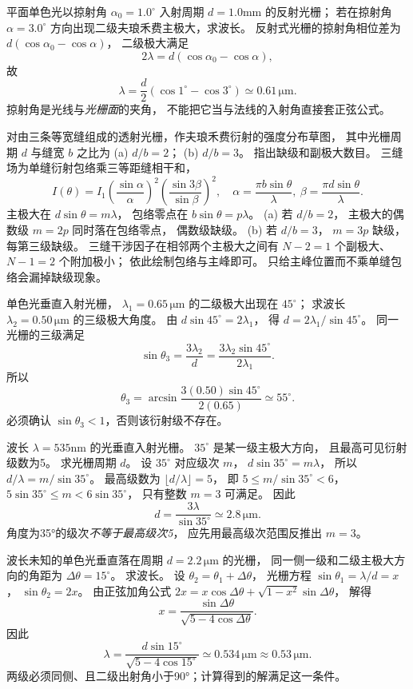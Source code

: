 平面单色光以掠射角
$\alpha_0=1.0^\circ$ 入射周期
$d=1.0$mm 的反射光栅；
若在掠射角 $\alpha=3.0^\circ$ 方向出现二级夫琅禾费主极大，求波长。
\exsolution
反射式光栅的掠射角相位差为
$d(\cos\alpha_0-\cos\alpha)$，
二级极大满足
\[
2\lambda=d(\cos\alpha_0-\cos\alpha),
\]
故
\[
\boxed{\lambda=
\frac d2(\cos1^\circ-\cos3^\circ)
\simeq0.61\,\mathrm{\mu m}}.
\]
\excheck 掠射角是光线与\emph{光栅面}的夹角，
不能把它当与法线的入射角直接套正弦公式。

对由三条等宽缝组成的透射光栅，作夫琅禾费衍射的强度分布草图，
其中光栅周期 $d$ 与缝宽 $b$ 之比为
(a) $d/b=2$；
(b) $d/b=3$。
指出缺级和副极大数目。
\exsolution
三缝场为单缝衍射包络乘三等距缝相干和，
\[
\boxed{I(\theta)=I_1
\left(\frac{\sin\alpha}{\alpha}\right)^2
\left(\frac{\sin3\beta}{\sin\beta}\right)^2},
\quad
\alpha=\frac{\pi b\sin\theta}{\lambda},\
\beta=\frac{\pi d\sin\theta}{\lambda}.
\]
主极大在 $d\sin\theta=m\lambda$，
包络零点在 $b\sin\theta=p\lambda$。
(a) 若 $d/b=2$，
主极大的偶数级 $m=2p$ 同时落在包络零点，
$\boxed{\text{偶数级缺级}}$。
(b) 若 $d/b=3$，
$m=3p$ 缺级，
$\boxed{\text{每第三级缺级}}$。
三缝干涉因子在相邻两个主极大之间有
$N-2=1$ 个副极大、$N-1=2$ 个附加极小；
依此绘制包络与主峰即可。
\excheck 只给主峰位置而不乘单缝包络会漏掉缺级现象。

单色光垂直入射光栅，
$\lambda_1=0.65\,\mathrm{\mu m}$ 的二级极大出现在
$45^\circ$；
求波长
$\lambda_2=0.50\,\mathrm{\mu m}$ 的三级极大角度。
\exsolution
由
$d\sin45^\circ=2\lambda_1$，
得
$d=2\lambda_1/\sin45^\circ$。
同一光栅的三级满足
\[
\sin\theta_3=\frac{3\lambda_2}{d}
=\frac{3\lambda_2\sin45^\circ}{2\lambda_1}.
\]
所以
\[
\boxed{\theta_3=
\arcsin\frac{3(0.50)\sin45^\circ}{2(0.65)}
\simeq55^\circ}.
\]
\excheck 必须确认 $\sin\theta_3<1$，否则该衍射级不存在。

波长 $\lambda=535$nm 的光垂直入射光栅。
$35^\circ$ 是某一级主极大方向，
且最高可见衍射级数为5。
求光栅周期 $d$。
\exsolution
设 $35^\circ$ 对应级次 $m$，
$d\sin35^\circ=m\lambda$，
所以 $d/\lambda=m/\sin35^\circ$。
最高级数为
$\lfloor d/\lambda\rfloor=5$，
即
$5\le m/\sin35^\circ<6$，
$5\sin35^\circ\le m<6\sin35^\circ$，
只有整数 $m=3$ 可满足。
因此
\[
\boxed{d=\frac{3\lambda}{\sin35^\circ}
\simeq2.8\,\mathrm{\mu m}}.
\]
\excheck 角度为35°的级次\emph{不等于最高级次5}，
应先用最高级次范围反推出 $m=3$。

波长未知的单色光垂直落在周期
$d=2.2\,\mathrm{\mu m}$ 的光栅，
同一侧一级和二级主极大方向的角距为
$\Delta\theta=15^\circ$。
求波长。
\exsolution
设 $\theta_2=\theta_1+\Delta\theta$，
光栅方程
$\sin\theta_1=\lambda/d=x$，
$\sin\theta_2=2x$。
由正弦加角公式
$2x=x\cos\Delta\theta+
\sqrt{1-x^2}\sin\Delta\theta$，
解得
\[
x=\frac{\sin\Delta\theta}
{\sqrt{5-4\cos\Delta\theta}}.
\]
因此
\[
\boxed{\lambda=
\frac{d\sin15^\circ}
{\sqrt{5-4\cos15^\circ}}
\simeq0.534\,\mathrm{\mu m}\approx0.53\,\mathrm{\mu m}}.
\]
\excheck 两级必须同侧、且二级出射角小于90°；计算得到的解满足这一条件。

